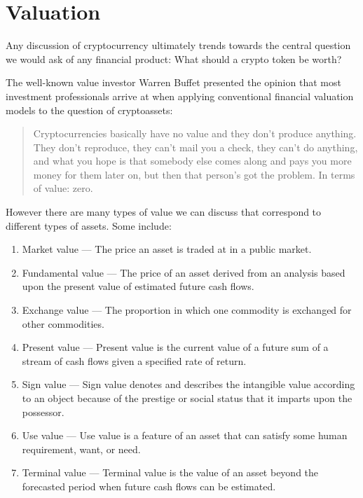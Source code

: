 \chapter{Valuation}

Any discussion of cryptocurrency ultimately trends towards the central question
we would ask of any financial product: What should a crypto token be worth?

The well-known value investor Warren Buffet presented the opinion that most
investment professionals arrive at when applying conventional financial
valuation models to the question of cryptoassets:


\begin{quote}
Cryptocurrencies basically have no value and they don't produce anything. They
don't reproduce, they can't mail you a check, they can't do anything, and what
you hope is that somebody else comes along and pays you more money for them
later on, but then that person's got the problem. In terms of value: zero.
\end{quote}

However there are many types of value we can discuss that correspond to
different types of assets. Some include:

\begin{enumerate}
\item Market value
  --- The price an asset is traded at in a public market.
\item Fundamental value
  --- The price of an asset derived from an analysis based upon the present
    value of estimated future cash flows.
\item Exchange value
  --- The proportion in which one commodity is exchanged for other commodities.
\item Present value
  --- Present value is the current value of a future sum of a stream of cash
    flows given a specified rate of return.
\item Sign value
  --- Sign value denotes and describes the intangible value according to an
    object because of the prestige or social status that it imparts upon the
    possessor.
\item Use value
  --- Use value is a feature of an asset that can satisfy some human
    requirement, want, or need.
\item Terminal value
  --- Terminal value is the value of an asset beyond the forecasted period when
    future cash flows can be estimated.
\end{enumerate}

